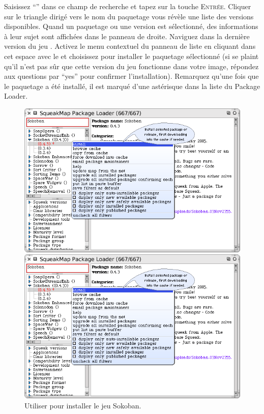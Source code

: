 \documentclass[a4paper,10pt,twoside]{book}
\begin{document}
Saisissez ``'' dans ce champ de recherche et
  tapez sur la touche \textsc{Entr\'ee}.
Cliquer sur le triangle dirig\'e vers le nom du paquetage vous
r\'ev\`ele une liste des versions disponibles. Quand un paquetage ou
une version est s\'electionn\'e, des informations \`a leur sujet sont
affich\'ees dans le panneau de droite.
Naviguez dans la derni\`ere version du jeu .
Activez le menu contextuel du panneau de liste en cliquant dans cet
espace avec le  et choisissez  pour
installer le paquetage s\'electionn\'e
(si \sq se plaint qu'il n'est pas s\^ur que cette version du jeu
fonctionne dans votre image, r\'epondez aux questions par ``yes'' 
pour confirmer l'installation).
Remarquez qu'une fois que le paquetage a \'et\'e install\'e, il est
marqu\'e d'une ast\'erisque dans la liste du \sqmap Package Loader.

\begin{figure}[htb]
\ifluluelse
	{\centerline {\includegraphics[width=\textwidth]{SqueakMap}}}
	{\centerline {\includegraphics[scale=0.7]{SqueakMap}}}
\caption{Utiliser \sqmap pour installer le jeu Sokoban.\label{fig:sokoban}}
\end{figure}
\end{document}
